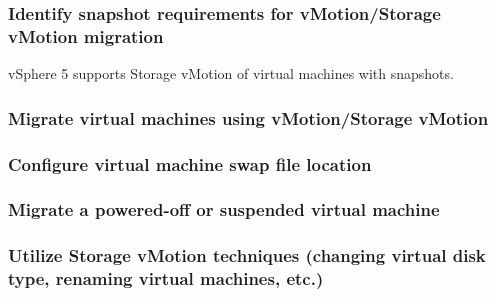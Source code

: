 \subsubsection{Identify snapshot requirements for vMotion/Storage vMotion migration}

vSphere 5 supports Storage vMotion of virtual machines with snapshots.

\subsubsection{Migrate virtual machines using vMotion/Storage vMotion}

\subsubsection{Configure virtual machine swap file location}

\subsubsection{Migrate a powered-off or suspended virtual machine}

\subsubsection{Utilize Storage vMotion techniques (changing virtual disk type, renaming virtual machines, etc.)}
